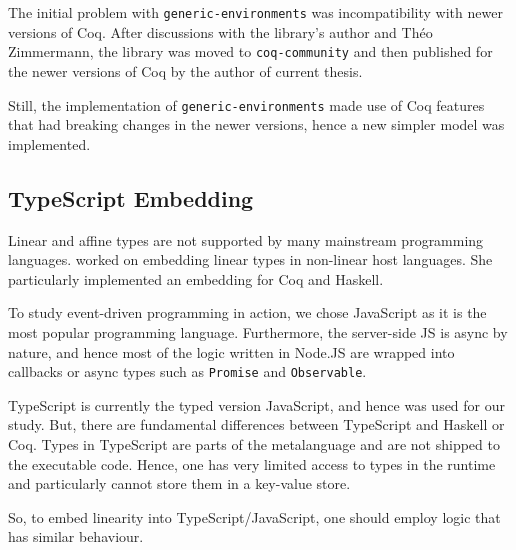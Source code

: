 The initial problem with \texttt{generic-environments} was incompatibility with newer versions of Coq. After discussions with the library's author and Th\'eo Zimmermann, the library was moved to \texttt{coq-community} and then published for the newer versions of Coq by the author of current thesis.

Still, the implementation of \texttt{generic-environments} made use of Coq features that had breaking changes in the newer versions, hence a new simpler model was implemented.

\subsection{TypeScript Embedding}

Linear and affine types are not supported by many mainstream programming languages. \cite{JenniferPaykin2018} worked on embedding linear types in non-linear host languages. She particularly implemented an embedding for Coq and Haskell.

To study event-driven programming in action, we chose JavaScript as it is the most popular programming language. Furthermore, the server-side JS is async by nature, and hence most of the logic written in Node.JS are wrapped into callbacks or async types such as \texttt{Promise} and \texttt{Observable}.

TypeScript is currently the typed version JavaScript, and hence was used for our study. But, there are fundamental differences between TypeScript and Haskell or Coq. Types in TypeScript are parts of the metalanguage and are not shipped to the executable code. Hence, one has very limited access to types in the runtime and particularly cannot store them in a key-value store.

So, to embed linearity into TypeScript/JavaScript, one should employ logic that has similar behaviour.


